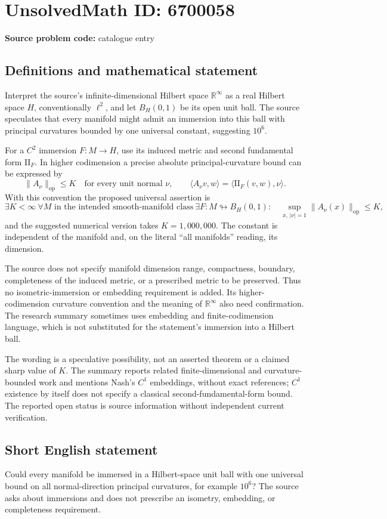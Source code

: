 \documentclass[11pt]{article}
\begin{document}
\section*{UnsolvedMath ID: 6700058}
\textbf{Source problem code:} catalogue entry
\subsection{Definitions and mathematical statement}
Interpret the source's infinite-dimensional Hilbert space \(\mathbb R^\infty\) as a real Hilbert space \(H\), conventionally \(\ell^2\), and let \(B_H(0,1)\) be its open unit ball. The source speculates that every manifold might admit an immersion into this ball with principal curvatures bounded by one universal constant, suggesting \(10^6\).

For a \(C^2\) immersion \(F:M\to H\), use its induced metric and second fundamental form \(\mathrm{II}_F\). In higher codimension a precise absolute principal-curvature bound can be expressed by
\[
 \|A_\nu\|_{\mathrm{op}}\le K
 \quad\text{for every unit normal }\nu,
 \qquad
 \langle A_\nu v,w\rangle=\langle\mathrm{II}_F(v,w),\nu\rangle.
\]
With this convention the proposed universal assertion is
\[
 \exists K<\infty\ \forall M\text{ in the intended smooth-manifold class}\ 
 \exists F:M\looparrowright B_H(0,1):
 \quad\sup_{x,\,|\nu|=1}\|A_\nu(x)\|_{\mathrm{op}}\le K,
\]
and the suggested numerical version takes \(K=1{,}000{,}000\). The constant is independent of the manifold and, on the literal ``all manifolds'' reading, its dimension.

The source does not specify manifold dimension range, compactness, boundary, completeness of the induced metric, or a prescribed metric to be preserved. Thus no isometric-immersion or embedding requirement is added. Its higher-codimension curvature convention and the meaning of \(\mathbb R^\infty\) also need confirmation. The research summary sometimes uses embedding and finite-codimension language, which is not substituted for the statement's immersion into a Hilbert ball.

The wording is a speculative possibility, not an asserted theorem or a claimed sharp value of \(K\). The summary reports related finite-dimensional and curvature-bounded work and mentions Nash's \(C^1\) embeddings, without exact references; \(C^1\) existence by itself does not specify a classical second-fundamental-form bound. The reported open status is source information without independent current verification.
\subsection{Short English statement}
Could every manifold be immersed in a Hilbert-space unit ball with one universal bound on all normal-direction principal curvatures, for example \(10^6\)? The source asks about immersions and does not prescribe an isometry, embedding, or completeness requirement.
\end{document}
